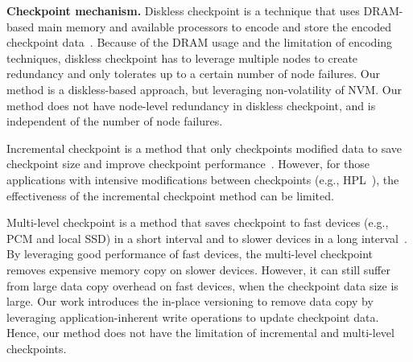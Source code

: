 \begin{spacing}{0.9}
\textbf{Checkpoint mechanism.}
Diskless checkpoint is a technique that uses DRAM-based main memory and available processors
to encode and store the encoded checkpoint data~\cite{tpds98:plank, Lu:2005:SDC:1145057, ppopp17:tang, isftc94:plank}. 
Because of the DRAM usage and the limitation of encoding techniques, diskless checkpoint has to leverage multiple nodes to create redundancy and only tolerates  up to a certain number of node failures.
Our method is a diskless-based approach, but leveraging non-volatility of NVM.
Our method does not have node-level redundancy in diskless checkpoint, and is independent of the number of node failures.

Incremental checkpoint is a method that only checkpoints modified data to save checkpoint size
and improve checkpoint performance~\cite{isftc94:plank, ics04:agarwal, icpads10:wang, ipdps09:bronevetsky}.
However, for those applications with intensive modifications between
checkpoints (e.g., HPL~\cite{ppopp17:tang}), the effectiveness of the incremental checkpoint method can be limited. 

Multi-level checkpoint is a method that saves checkpoint to fast devices (e.g., PCM and local SSD) 
in a short interval and to slower devices in a long interval~\cite{sc10:moody, sc09:dong, sc11:gomez}. 
By leveraging good performance of fast devices, the multi-level checkpoint removes expensive memory copy on slower devices. %
However, it can still suffer from large data copy overhead on fast devices, when
the checkpoint data size is large.
Our work introduces the in-place versioning to 
remove data copy by leveraging application-inherent write operations to update checkpoint data.
Hence, our method does not have the limitation of incremental and multi-level checkpoints.
\vspace{-10pt}
\end{spacing}






